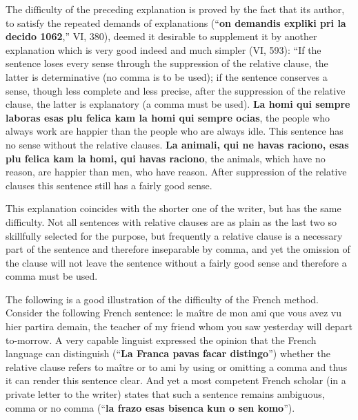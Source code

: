 The difficulty of the preceding explanation is proved by the fact that its author, to satisfy the repeated demands of explanations (``\textbf{on demandis expliki pri la decido 1062},'' VI, 380), deemed it desirable to supplement it by another explanation which is very good indeed and much simpler (VI, 593): ``If the sentence loses every sense through the suppression of the relative clause, the latter is determinative (no comma is to be used); if the sentence conserves a sense, though less complete and less precise, after the suppression of the relative clause, the latter is explanatory (a comma must be used). \textbf{La homi qui sempre laboras esas plu felica kam la homi qui sempre ocias}, the people who always work are happier than the people who are always idle. This sentence has no sense without the relative clauses. \textbf{La animali, qui ne havas raciono, esas plu felica kam la homi, qui havas raciono}, the animals, which have no reason, are happier than men, who have reason. After suppression of the relative clauses this sentence still has a fairly good sense.

This explanation coincides with the shorter one of the writer, but has the same difficulty. Not all sentences with relative clauses are as plain as the last two so skillfully selected for the purpose, but frequently a relative clause is a necessary part of the sentence and therefore inseparable by comma, and yet the omission of the clause will not leave the sentence without a fairly good sense and therefore a comma must be used.

The following is a good illustration of the difficulty of the French method. Consider the following French sentence: le maître de mon ami que vous avez vu hier partira demain, the teacher of my friend whom you saw yesterday will depart to-morrow. A very capable linguist expressed the opinion that the French language can distinguish (``\textbf{La Franca pavas facar distingo}'') whether the relative clause refers to maître or to ami by using or omitting a comma and thus it can render this sentence clear. And yet a most competent French scholar (in a private letter to the writer) states that such a sentence remains ambiguous, comma or no comma (``\textbf{la frazo esas bisenca kun o sen komo}'').

